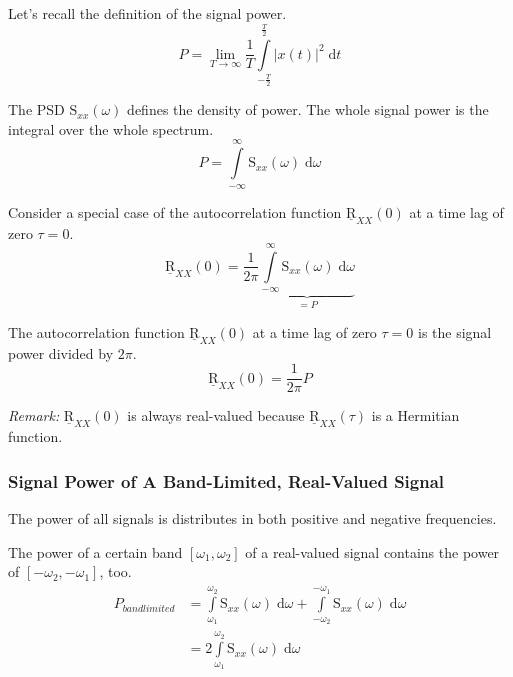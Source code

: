 \begin{refsection}
Let's recall the definition of the signal power.
\begin{equation}
	P = \lim\limits_{T \rightarrow \infty} \frac{1}{T} \int\limits_{-\frac{T}{2}}^{\frac{T}{2}} \left|x(t)\right|^2 \; \mathrm{d} t
\end{equation}

The \ac{PSD} $\mathrm{S}_{xx}(\omega)$ defines the density of power. The whole signal power is the integral over the whole spectrum.
\begin{equation}
	P = \int\limits_{-\infty}^{\infty} \mathrm{S}_{xx}(\omega) \; \mathrm{d} \omega
\end{equation}

Consider a special case of the autocorrelation function $\underline{\mathrm{R}}_{XX}(0)$ at a time lag of zero $\tau = 0$.
\begin{equation}
	\underline{\mathrm{R}}_{XX}(0) = \frac{1}{2 \pi} \underbrace{\int\limits_{-\infty}^{\infty} \mathrm{S}_{xx}(\omega) \; \mathrm{d} \omega}_{= P}
\end{equation}

The autocorrelation function $\underline{\mathrm{R}}_{XX}(0)$ at a time lag of zero $\tau = 0$ is the signal power divided by $2 \pi$.
\begin{equation}
	\underline{\mathrm{R}}_{XX}(0) = \frac{1}{2 \pi} P
\end{equation}

\textit{Remark:} $\underline{\mathrm{R}}_{XX}(0)$ is always real-valued because $\underline{\mathrm{R}}_{XX}(\tau)$ is a Hermitian function.

\subsubsection{Signal Power of A Band-Limited, Real-Valued Signal}

The power of all signals is distributes in both positive and negative frequencies.

The power of a certain band $[\omega_1, \omega_2]$ of a real-valued signal contains the power of $[-\omega_2, -\omega_1]$, too.
\begin{equation}
	\begin{split}
		P_{bandlimited} &= \int\limits_{\omega_1}^{\omega_2} \mathrm{S}_{xx}(\omega) \; \mathrm{d} \omega + \int\limits_{-\omega_2}^{-\omega_1} \mathrm{S}_{xx}(\omega) \; \mathrm{d} \omega \\
		 &= 2 \int\limits_{\omega_1}^{\omega_2} \mathrm{S}_{xx}(\omega) \; \mathrm{d} \omega
	\end{split}
\end{equation}


\end{refsection}

